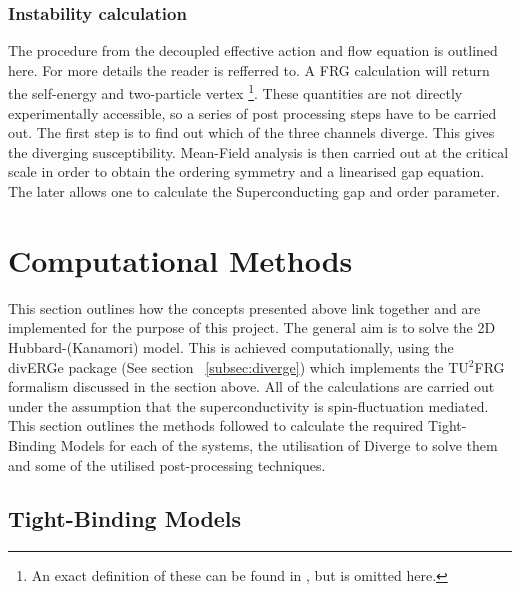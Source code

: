 \documentclass[12pt]{article}
\begin{document}
\medskip





\subsubsection{Instability calculation}

The procedure from the decoupled  effective action and flow equation is outlined here. For more details the reader is refferred to\cite{profe2023functional}. 
A FRG calculation will return the self-energy and two-particle vertex \footnote{An exact definition of these can be found in \cite{metzner2012functional}, but is omitted here.}. These quantities are
not directly experimentally accessible, so a series of post processing steps have to be carried out. The first step is to find out which of the three channels diverge. 
This gives the diverging susceptibility. Mean-Field analysis is then carried out at the critical scale in order to obtain
the ordering symmetry and a linearised gap equation. The later allows one to calculate the Superconducting gap and order parameter. 



\section{Computational Methods}

This section outlines how the concepts presented above link together and are implemented for the purpose of this project. 
The general aim is to solve the 2D Hubbard-(Kanamori) model. This is achieved computationally, using the divERGe package (See section ~\ref{subsec:diverge}) which implements the TU$^2$FRG
formalism discussed in the section above. All of the calculations are carried out under the assumption that the superconductivity 
is spin-fluctuation mediated. This section outlines the methods followed to calculate the required Tight-Binding Models for each of the systems, the utilisation of 
Diverge to solve them and some of the utilised post-processing techniques. 

\subsection{Tight-Binding Models}
\end{document}
